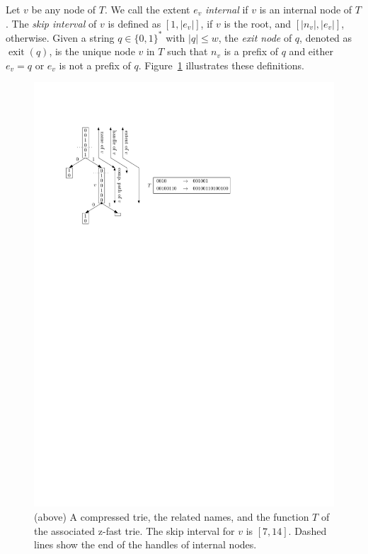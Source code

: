 \documentclass[a4paper,11pt]{article}
\newcommand{\?}{\mskip1.5mu}
\DeclareMathOperator{\exit}{exit}
\begin{document}
Let $v$ be any node of $T$.
We call the extent $e_v$ 
\emph{internal} if $v$ is an internal node of $T$.
The \emph{skip interval} of $v$ is defined as
$[1, |e_v|]$, if $v$ is the root, and $[|n_v|, |e_v|]$, otherwise.
Given a string $q \in \{0, 1\}^*$ with $|q| \leq w$, the 
\emph{exit node} of $q$, denoted as $\exit(q)$, is the unique node
$v$ in $T$ such that $n_v$ is a prefix of $q$ and either
$e_v = q$ or $e_v$ is not a prefix of $q$.
Figure~\ref{fig:ztrie} illustrates these definitions.

\begin{figure}[t]
\centering
\includegraphics[scale=.80]{zpred-1}
\caption{(above) A compressed trie, the 
related names, and the function $T$ of the associated 
z-fast trie. The skip interval for $v$ is $[7, 14]$. 
Dashed lines show the end of the handles of internal nodes.}
\label{fig:ztrie}
\end{figure}
\end{document}
